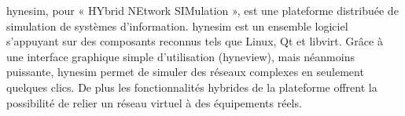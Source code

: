 hynesim, pour « HYbrid NEtwork SIMulation », est une plateforme distribuée de simulation de systèmes d’information. hynesim est un ensemble logiciel s’appuyant sur des composants reconnus tels que Linux, Qt et libvirt. Grâce à une interface graphique simple d’utilisation (hyneview), mais néanmoins puissante, hynesim permet de simuler des réseaux complexes en seulement quelques clics. De plus les fonctionnalités hybrides de la plateforme offrent la possibilité de relier un réseau virtuel à des équipements réels.